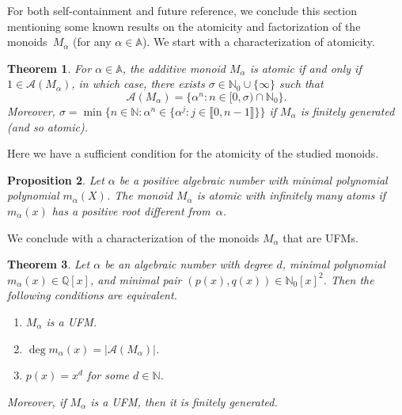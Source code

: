 \documentclass[11pt]{amsart}
\newtheorem{theorem}{Theorem}[section]
\newtheorem{proposition}[theorem]{Proposition}
\theoremstyle{definition}
\theoremstyle{remark}
\numberwithin{equation}{section}
\newcommand{\aaa}{\mathbb{A}}
\newcommand{\nn}{\mathbb{N}}
\newcommand{\N}{\mathbb{N}}
\newcommand{\qq}{\mathbb{Q}}
\providecommand\ldb{\llbracket}
\providecommand\rdb{\rrbracket}
\begin{document}
For both self-containment and future reference, we conclude this section mentioning some known results on the atomicity and factorization of the monoids~$M_\alpha$ (for any $\alpha \in \aaa$). We start with a characterization of atomicity.

\begin{theorem}\label{thm:atomicity of M alpha}\cite[Theorem~4.2]{CG22} 
    For $\alpha \in \aaa$, the additive monoid $M_\alpha$ is atomic if and only if $1 \in \mathcal{A}(M_\alpha)$, in which case, there exists $\sigma \in \nn_0 \cup \{ \infty \}$ such that
    \begin{equation}
        \mathcal{A}(M_\alpha) = \{\alpha^n : n \in [0, \sigma)  \cap \nn_0 \}.
    \end{equation}
    Moreover, $\sigma = \min \{ n \in \nn : \alpha^n \in \{\alpha^j : j \in \ldb 0, n-1 \rdb \} \}$ if  $M_\alpha$ is finitely generated (and so atomic).
\end{theorem}

Here we have a sufficient condition for the atomicity of the studied monoids.

\begin{proposition}\label{prop:sufficient condition for atomicity}\cite[Proposition~4.5]{AGS25}
    Let $\alpha$ be a positive algebraic number with minimal polynomial polynomial $m_\alpha(X)$. The monoid $M_\alpha$ is atomic with infinitely many atoms if $m_{\alpha}(x)$ has a positive root different from~$\alpha$.
\end{proposition}

We conclude with a characterization of the monoids $M_\alpha$ that are UFMs.

\begin{theorem}\cite[Theorem~5.4]{CG22}  \label{thm:factoriality characterization}
    Let $\alpha$ be an algebraic number with degree $d$, minimal polynomial $m_\alpha(x) \in \qq[x]$, and minimal pair $(p(x), q(x)) \in \nn_0[x]^2$. Then the following conditions are equivalent.
        \begin{enumerate}
            \item[(a)] $M_\alpha$ is a UFM.
            \smallskip
            
            \item[(b)] $\deg m_\alpha(x) = |\mathcal{A}(M_\alpha)|$.
            \smallskip
            
            \item[(c)] $p(x) = x^d$ for some $d \in \N$.
        \end{enumerate}
        Moreover, if $M_\alpha$ is a UFM, then it is finitely generated.
\end{theorem}
\end{document}
